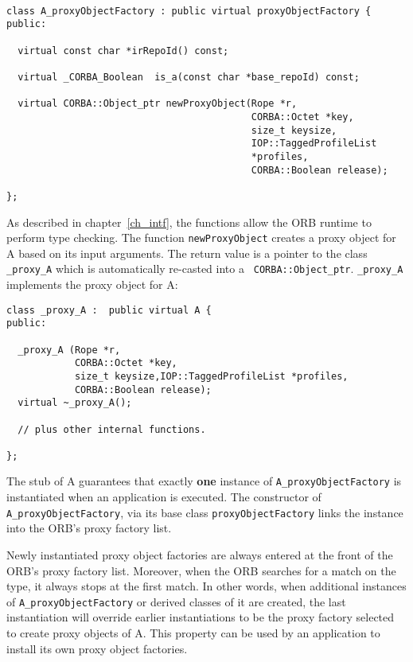 \documentclass[11pt,twoside,onecolumn]{book}
\begin{document}
{\small
\begin{verbatim}

class A_proxyObjectFactory : public virtual proxyObjectFactory {
public:

  virtual const char *irRepoId() const;

  virtual _CORBA_Boolean  is_a(const char *base_repoId) const;
       
  virtual CORBA::Object_ptr newProxyObject(Rope *r,
                                           CORBA::Octet *key,
                                           size_t keysize,
                                           IOP::TaggedProfileList
                                           *profiles,
                                           CORBA::Boolean release);

};

\end{verbatim}
}

As described in chapter~\ref{ch_intf}, the functions allow the ORB runtime
to perform type checking. The function {\tt newProxyObject} creates a proxy
object for A based on its input arguments. The return value is a pointer to
the class {\tt \_proxy\_A} which is automatically re-casted into a {\tt
CORBA::Object\_ptr}.  {\tt \_proxy\_A} implements the proxy object for A:

{\small
\begin{verbatim}
class _proxy_A :  public virtual A {
public:

  _proxy_A (Rope *r,
            CORBA::Octet *key,
            size_t keysize,IOP::TaggedProfileList *profiles,
            CORBA::Boolean release);
  virtual ~_proxy_A();

  // plus other internal functions.

};
\end{verbatim}
}

The stub of A guarantees that exactly {\bf one} instance of
{\tt A\_proxyObjectFactory} is instantiated when an application is
executed. The constructor of {\tt A\_proxyObjectFactory}, via its
base class {\tt proxyObjectFactory} links the instance into the ORB's
proxy factory list. 

Newly instantiated proxy object factories are always entered at the front
of the ORB's proxy factory list. Moreover, when the ORB searches for a
match on the type, it always stops at the first match. In other words, when
additional instances of {\tt A\_proxyObjectFactory} or derived classes of
it are created, the last instantiation will override earlier instantiations
to be the proxy factory selected to create proxy objects of A. This
property can be used by an application to install its
own proxy object factories.
\end{document}

